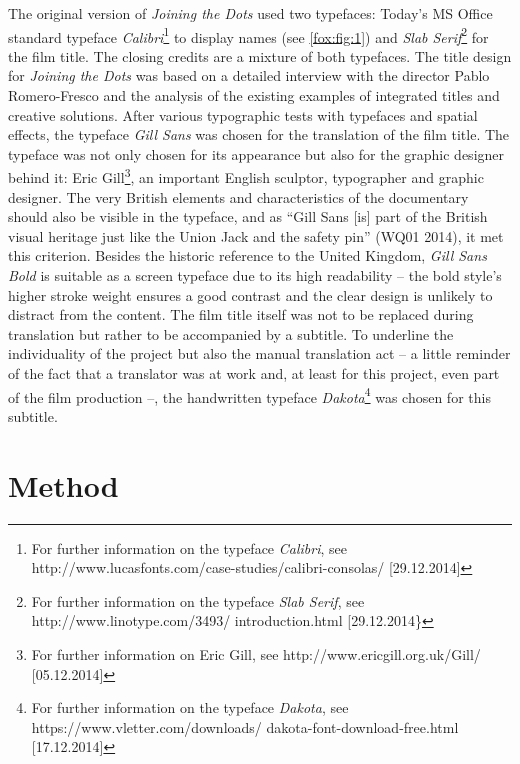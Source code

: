 \documentclass[output=paper]{langsci/langscibook}
\begin{document}
The original version of \textit{Joining the Dots} used two typefaces: Today’s MS Office standard typeface \textit{Calibri}\footnote{For further information on the typeface \textit{Calibri}, see http://www.lucasfonts.com/case-studies/calibri-consolas/ [29.12.2014]} to display names (see \ref{fox:fig:1}) and \textit{Slab Serif}\footnote{For further information on the typeface \textit{Slab Serif}, see http://www.linotype.com/3493/ introduction.html [29.12.2014\}} for the film title. The closing credits are a mixture of both typefaces. The title design for \textit{Joining the Dots} was based on a detailed interview with the director Pablo Romero-Fresco and the analysis of the existing examples of integrated titles and creative solutions. After various typographic tests with typefaces and spatial effects, the typeface \textit{Gill Sans} was chosen for the translation of the film title. The typeface was not only chosen for its appearance but also for the graphic designer behind it: Eric Gill\footnote{For further information on Eric Gill, see http://www.ericgill.org.uk/Gill/ [05.12.2014]}, an important English sculptor, typographer and graphic designer. The very British elements and characteristics of the documentary should also be visible in the typeface, and as “Gill Sans [is] part of the British visual heritage just like the Union Jack and the safety pin” (WQ01 2014), it met this criterion. Besides the historic reference to the United Kingdom, \textit{Gill Sans Bold} is suitable as a screen typeface due to its high readability – the bold style’s higher stroke weight ensures a good contrast and the clear design is unlikely to distract from the content. The film title itself was not to be replaced during translation but rather to be accompanied by a subtitle. To underline the individuality of the project but also the manual translation act – a little reminder of the fact that a translator was at work and, at least for this project, even part of the film production –, the handwritten typeface \textit{Dakota}\footnote{For further information on the typeface \textit{Dakota}, see https://www.vletter.com/downloads/ dakota-font-download-free.html [17.12.2014]} was chosen for this subtitle.

\section{Method}
\end{document}
